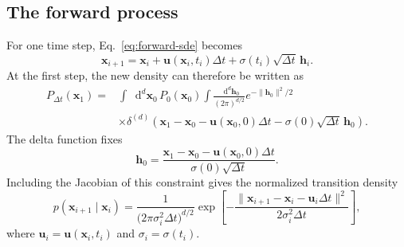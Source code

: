 \documentclass[11pt]{article}
\newcommand{\vct}[1]{\bm{#1}}
\newcommand{\dd}{\mathop{}\!\mathrm{d}}
\begin{document}
\subsection{The forward process}

For one time step, Eq.~\eqref{eq:forward-sde} becomes
\begin{equation}
    \vct{x}_{i+1}
    =\vct{x}_i+\vct{u}(\vct{x}_i,t_i)\Delta t
     +\sigma(t_i)\sqrt{\Delta t}\,\vct{h}_i.
    \label{eq:euler-maruyama}
\end{equation}
At the first step, the new density can therefore be written as
\begin{align}
    P_{\Delta t}(\vct{x}_1)
    ={}&\int \dd^d\vct{x}_0\,P_0(\vct{x}_0)
    \int\frac{\dd^d\vct{h}_0}{(2\pi)^{d/2}}
    e^{-\lVert\vct{h}_0\rVert^2/2}
    \nonumber\\
    &\times\delta^{(d)}\!\left(
    \vct{x}_1-\vct{x}_0-\vct{u}(\vct{x}_0,0)\Delta t
    -\sigma(0)\sqrt{\Delta t}\,\vct{h}_0\right).
    \label{eq:one-step-delta}
\end{align}
The delta function fixes
\begin{equation}
    \vct{h}_0
    =\frac{\vct{x}_1-\vct{x}_0-\vct{u}(\vct{x}_0,0)\Delta t}
    {\sigma(0)\sqrt{\Delta t}}.
\end{equation}
Including the Jacobian of this constraint gives the normalized transition
density
\begin{equation}
    p(\vct{x}_{i+1}\mid\vct{x}_i)
    =\frac{1}{\bigl(2\pi\sigma_i^2\Delta t\bigr)^{d/2}}
    \exp\!\left[-\frac{\lVert
    \vct{x}_{i+1}-\vct{x}_i-\vct{u}_i\Delta t
    \rVert^2}{2\sigma_i^2\Delta t}\right],
    \label{eq:transition-kernel}
\end{equation}
where \(\vct{u}_i=\vct{u}(\vct{x}_i,t_i)\) and \(\sigma_i=\sigma(t_i)\).
\end{document}
